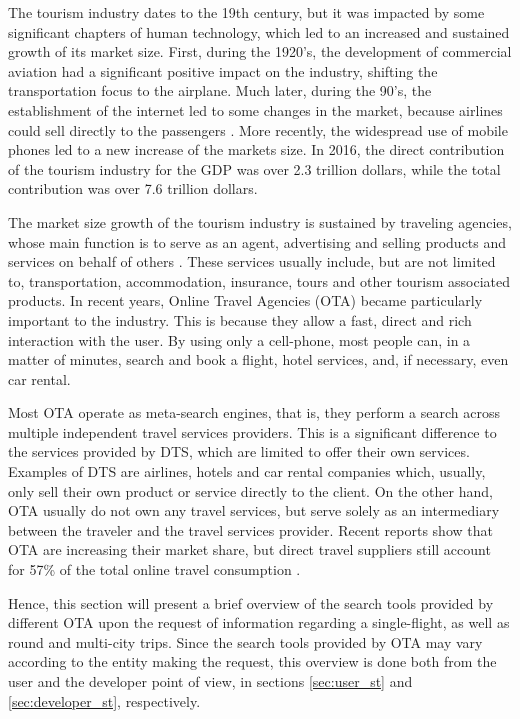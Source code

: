 The tourism industry dates to the 19th century, but it was impacted by some significant chapters of human technology, which led to an increased and sustained growth of its market size. First, during the 1920's, the development of commercial aviation had a significant positive impact on the industry, shifting the transportation focus to the airplane. Much later, during the 90's, the establishment of the internet led to some changes in the market, because airlines could sell directly to the passengers \cite{tourism_tec}. More recently, the widespread use of mobile phones led to a new increase of the markets size. In 2016, the direct contribution of the tourism industry for the GDP was over 2.3 trillion dollars, while the total contribution was over 7.6 trillion dollars\cite{travel_report}.

The market size growth of the tourism industry is sustained by traveling agencies, whose main function is to serve as an agent, advertising and selling products and services on behalf of others \cite{book_tourism}. These services usually include, but are not limited to, transportation, accommodation, insurance, tours and other tourism associated products. In recent years, Online Travel Agencies (OTA) became particularly important to the industry. This is because they allow a fast, direct and rich interaction with the user. By using only a cell-phone, most people can, in a matter of minutes, search and book a flight, hotel services, and, if necessary, even car rental. 
   
Most OTA operate as meta-search engines, that is, they perform a search across multiple independent travel services providers. This is a significant difference to the services provided by \ac{DTS}, which are limited to offer their own services. Examples of DTS are airlines, hotels and car rental companies which, usually, only sell their own product or service directly to the client. On the other hand, OTA usually do not own any travel services, but serve solely as an intermediary between the traveler and the travel services provider. Recent reports show that OTA are increasing their market share, but direct travel suppliers still account for 57\% of the total online travel consumption \cite{OTA_industry_report}.

Hence, this section will present a brief overview of the search tools provided by different OTA upon the request of information regarding a single-flight, as well as round and multi-city trips. Since the search tools provided by OTA may vary according to the entity making the request, this overview is done both from the user and the developer point of view, in sections \ref{sec:user_st} and \ref{sec:developer_st}, respectively.